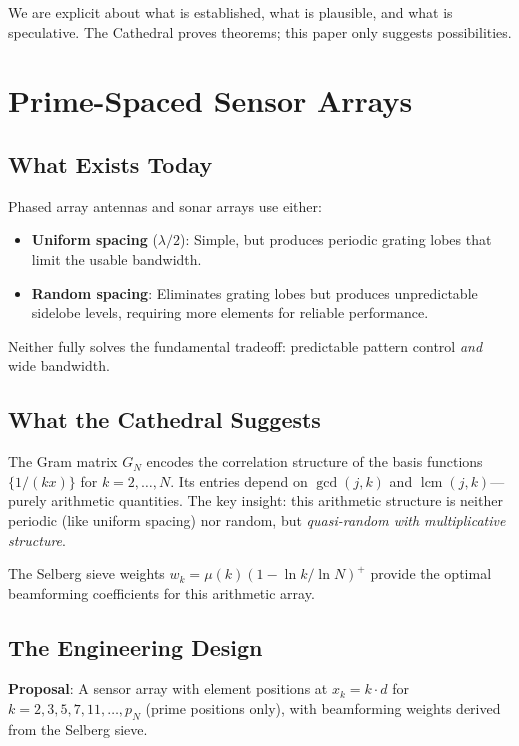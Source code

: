 \documentclass[11pt,a4paper]{article}
\begin{document}
We are explicit about what is established, what is plausible, and
what is speculative. The Cathedral proves theorems; this paper only
suggests possibilities.

\section{Prime-Spaced Sensor Arrays}
\label{sec:arrays}

\subsection{What Exists Today}

Phased array antennas and sonar arrays use either:
\begin{itemize}
  \item \textbf{Uniform spacing} ($\lambda/2$): Simple, but produces
    periodic grating lobes that limit the usable bandwidth.
  \item \textbf{Random spacing}: Eliminates grating lobes but
    produces unpredictable sidelobe levels, requiring more elements
    for reliable performance.
\end{itemize}

Neither fully solves the fundamental tradeoff: predictable pattern
control \emph{and} wide bandwidth.

\subsection{What the Cathedral Suggests}

The Gram matrix $G_N$ encodes the correlation structure of the basis
functions $\{1/(kx)\}$ for $k = 2, \ldots, N$. Its entries depend
on $\gcd(j,k)$ and $\operatorname{lcm}(j,k)$---purely arithmetic
quantities. The key insight: this arithmetic structure is neither
periodic (like uniform spacing) nor random, but \emph{quasi-random
with multiplicative structure}.

The Selberg sieve weights $w_k = \mu(k)(1 - \ln k / \ln N)^+$
provide the optimal beamforming coefficients for this arithmetic
array.

\subsection{The Engineering Design}

\textbf{Proposal}: A sensor array with element positions at
$x_k = k \cdot d$ for $k = 2, 3, 5, 7, 11, \ldots, p_N$ (prime
positions only), with beamforming weights derived from the Selberg
sieve.
\end{document}
